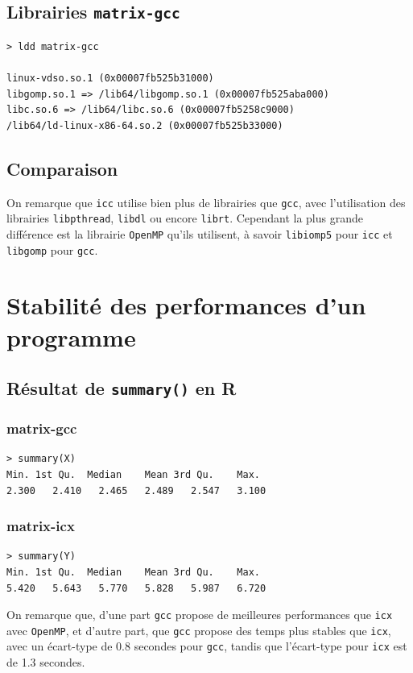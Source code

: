 \documentclass{rapport}
\begin{document}
\subsection*{Librairies \texttt{matrix-gcc}}
\begin{lstlisting}
> ldd matrix-gcc

linux-vdso.so.1 (0x00007fb525b31000)
libgomp.so.1 => /lib64/libgomp.so.1 (0x00007fb525aba000)
libc.so.6 => /lib64/libc.so.6 (0x00007fb5258c9000)
/lib64/ld-linux-x86-64.so.2 (0x00007fb525b33000)
\end{lstlisting}

\subsection*{Comparaison}
On remarque que \texttt{icc} utilise bien plus de librairies que \texttt{gcc}, avec l'utilisation des librairies \texttt{libpthread}, \texttt{libdl} ou encore \texttt{librt}.
\newline Cependant la plus grande différence est la librairie \texttt{OpenMP} qu'ils utilisent, à savoir \texttt{libiomp5} pour \texttt{icc} et \texttt{libgomp} pour \texttt{gcc}.


\section{Stabilité des performances d'un programme}
\subsection{Résultat de \texttt{summary()} en R}
\subsubsection*{matrix-gcc}
\begin{lstlisting}
> summary(X)
Min. 1st Qu.  Median    Mean 3rd Qu.    Max.
2.300   2.410   2.465   2.489   2.547   3.100
\end{lstlisting}
\subsubsection*{matrix-icx}
\begin{lstlisting}
> summary(Y)
Min. 1st Qu.  Median    Mean 3rd Qu.    Max.
5.420   5.643   5.770   5.828   5.987   6.720
\end{lstlisting}
On remarque que, d'une part \texttt{gcc} propose de meilleures performances que \texttt{icx} avec \texttt{OpenMP}, et d'autre part, que \texttt{gcc} propose des temps plus stables que \texttt{icx}, avec un écart-type de 0.8 secondes pour \texttt{gcc}, tandis que l'écart-type pour \texttt{icx} est de 1.3 secondes.
\end{document}
